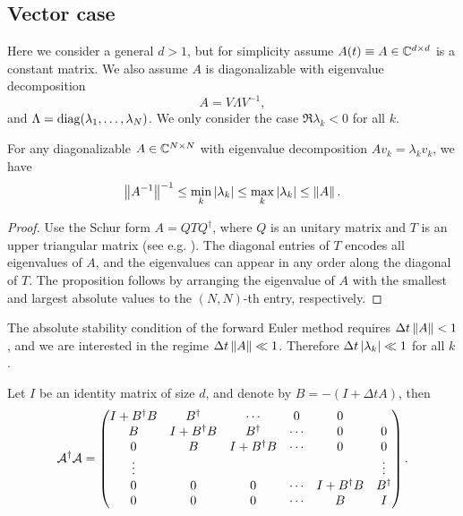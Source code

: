 \subsection{Vector case}
Here we consider a general $d>1$, but for simplicity assume $A(t)\equiv A\in\mathbb{C}^{d\times d}$ is a constant matrix. We also assume $A$ is diagonalizable with eigenvalue decomposition
\begin{equation}
A=V\Lambda V^{-1},
\end{equation}
and $\Lambda=\operatorname{diag}(\lambda_1,\ldots,\lambda_N)$. We only consider the case $\Re \lambda_k< 0$ for all $k$.

\begin{prop}
For any diagonalizable $A\in\mathbb{C}^{N\times N}$ with eigenvalue decomposition $Av_k=\lambda_k v_k$, we have
\begin{equation}
\left\lVert A^{-1}\right\rVert^{-1}\le \min_k \left\lvert\lambda_k\right\rvert\le \max_k \left\lvert\lambda_k\right\rvert\le \left\lVert A\right\rVert.
\end{equation}
\end{prop}
\begin{proof}
Use the Schur form $A=QTQ^{\dag}$, where $Q$ is an unitary matrix and $T$ is an upper triangular matrix (see e.g. \cite[Theorem 7.13]{GolubVan2013}).
The diagonal entries of $T$ encodes all eigenvalues of $A$, and the eigenvalues can appear in any order along the diagonal of $T$. The proposition follows by arranging the eigenvalue of $A$ with the smallest and largest absolute values to the $(N,N)$-th entry, respectively.
\end{proof}

The absolute stability condition of the forward Euler method requires $\Delta t \left\lVert A\right\rVert<1$, and we are interested in the regime $\Delta t \left\lVert A\right\rVert\ll 1$. Therefore $\Delta t \left\lvert\lambda_k\right\rvert\ll 1$ for all $k$.


Let $I$ be an identity matrix of size $d$, and denote by $B=-(I+\Delta t A)$, then
\begin{equation}
\mathcal{A}^{\dag}\mathcal{A}=\begin{pmatrix}
I+B^{\dag}B &  B^{\dag} & \cdots & 0 & 0\\
B & I+B^{\dag}B & B^{\dag} & \cdots & 0 & 0\\
0 & B & I+B^{\dag}B & \cdots & 0 & 0\\
\vdots & & & & &\vdots\\
0& 0 & 0 & \cdots & I+B^{\dag}B & B^{\dag}\\
0& 0 & 0 & \cdots & B & I
\end{pmatrix}.
\end{equation}

